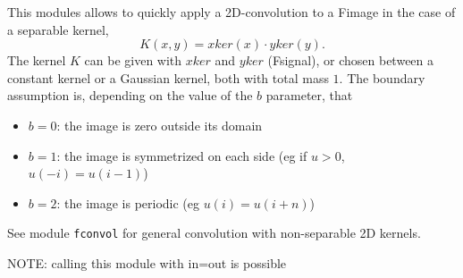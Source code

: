 This modules allows to quickly apply a 2D-convolution 
to a Fimage in the 
case of a separable kernel,
$$K(x,y)=xker(x)\cdot yker(y).$$
The kernel $K$ can be given with $xker$ and $yker$ (Fsignal), or 
chosen between a constant kernel or a Gaussian kernel, both
with total mass $1$. The boundary assumption is, depending on
the value of the $b$ parameter, that
\begin{itemize}
\item $b=0$: the image is zero outside its domain
\item $b=1$: the image is symmetrized on each side 
(eg if $u>0$, $u(-i)=u(i-1)$) 
\item $b=2$: the image is periodic (eg $u(i) = u(i+n)$)
\end{itemize}
See module \verb+fconvol+ for general
convolution with non-separable 2D kernels.

\medskip

NOTE: calling this module with in=out is possible
